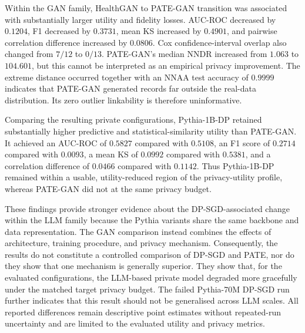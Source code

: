 Within the GAN family, HealthGAN to PATE-GAN transition was
associated with substantially larger utility and fidelity losses.
AUC-ROC decreased by $0.1204$, F1 decreased by $0.3731$, mean KS
increased by $0.4901$, and pairwise correlation difference increased by
$0.0806$. Cox confidence-interval overlap also changed from $7/12$ to
$0/13$. PATE-GAN's median NNDR increased from $1.063$ to $104.601$, but
this cannot be interpreted as an empirical privacy improvement. The
extreme distance occurred together with an NNAA test accuracy of $0.9999$
indicates that PATE-GAN generated records
far outside the real-data distribution. Its zero outlier linkability is
therefore uninformative.

Comparing the resulting private configurations, Pythia-1B-DP retained
substantially higher predictive and statistical-similarity utility than
PATE-GAN. It achieved an AUC-ROC of $0.5827$ compared with $0.5108$, an
F1 score of $0.2714$ compared with $0.0093$, a mean KS of $0.0992$
compared with $0.5381$, and a correlation difference of $0.0466$
compared with $0.1142$. Thus Pythia-1B-DP remained within a usable, utility-reduced region
of the privacy-utility profile, whereas PATE-GAN did not at the same privacy budget.

These findings provide stronger evidence about the DP-SGD-associated
change within the LLM family because the Pythia variants share the same
backbone and data representation. The GAN comparison instead combines 
the effects of architecture, training
procedure, and privacy mechanism. Consequently,
the results do not constitute a controlled comparison of DP-SGD and PATE,
nor do they show that one mechanism is generally superior. They show that,
for the evaluated configurations, the LLM-based private model degraded
more gracefully under the matched target privacy budget. The failed
Pythia-70M DP-SGD run further indicates that this result should not be
generalised across LLM scales. All reported differences remain
descriptive point estimates without repeated-run uncertainty and are
limited to the evaluated utility and privacy metrics.

\cleardoublepage

